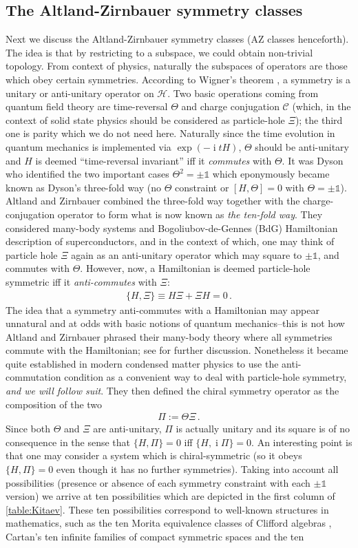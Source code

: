 \documentclass[a4paper,10pt]{article}
\numberwithin{equation}{section}
\theoremstyle{plain}
\theoremstyle{plain}
\theoremstyle{plain}
\theoremstyle{plain}
\theoremstyle{plain}
\theoremstyle{remark}
\theoremstyle{definition}
\theoremstyle{plain}
\newcommand{\ii}{\operatorname{i}}
\newcommand{\calC}{\mathcal{C}}
\newcommand{\calH}{\mathcal{H}}
\newcommand{\Id}{\mathds{1}}
\newcommand{\eq}[1]{\begin{align*}#1\end{align*}}
\newcommand{\eql}[1]{\begin{align}#1\end{align}}
\begin{document}
	\subsection{The Altland-Zirnbauer symmetry classes} 
	Next we discuss the Altland-Zirnbauer symmetry classes \cite{AltlandZirnbauer1997} (AZ classes henceforth). The idea is that by restricting to a subspace, we could obtain non-trivial topology. From context of physics, naturally the subspaces of operators are those which obey certain symmetries. According to Wigner's theorem \cite{Bargmann1964}, a symmetry is a unitary or anti-unitary operator on $\calH$. Two basic operations coming from quantum field theory are time-reversal $\Theta$ and charge conjugation $\calC$ (which, in the context of solid state physics should be considered as particle-hole $\Xi$); the third one is parity which we do not need here. Naturally since the time evolution in quantum mechanics is implemented via $\exp(-\ii t H)$, $\Theta$ should be anti-unitary and $H$ is deemed ``time-reversal invariant'' iff it \emph{commutes} with $\Theta$. It was Dyson \cite{Dyson1962} who identified the two important cases $\Theta^2=\pm\Id$ which eponymously became known as Dyson's three-fold way (no $\Theta$ constraint or $[H,\Theta]=0$ with $\Theta=\pm\Id$). Altland and Zirnbauer \cite{AltlandZirnbauer1997} combined the three-fold way together with the charge-conjugation operator to form what is now known as \emph{the ten-fold way}. They considered many-body systems and Bogoliubov-de-Gennes (BdG) Hamiltonian description of superconductors, and in the context of which, one may think of particle hole $\Xi$ again as an anti-unitary operator which may square to $\pm\Id$, and commutes with $\Theta$. However, now, a Hamiltonian is deemed particle-hole symmetric iff it \emph{anti-commutes} with $\Xi$: \eql{\{H,\Xi\}\equiv H\Xi+\Xi H = 0\,.} The idea that a symmetry anti-commutes with a Hamiltonian may appear unnatural and at odds with basic notions of quantum mechanics--this is not how Altland and Zirnbauer phrased their many-body theory where all symmetries commute with the Hamiltonian; see \cite{Zirnbauer2021} for further discussion. Nonetheless it became quite established in modern condensed matter physics to use the anti-commutation condition as a convenient way to deal with particle-hole symmetry, \emph{and we will follow suit}. They then defined the chiral symmetry operator as the composition of the two \eq{\Pi := \Theta \Xi\,.} Since both $\Theta$ and $\Xi$ are anti-unitary, $\Pi$ is actually unitary and its square is of no consequence in the sense that $\{H,\Pi\}=0$ iff $\{H,\ii \Pi\}=0$. An interesting point is that one may consider a system which is chiral-symmetric (so it obeys $\{H,\Pi\}=0$ even though it has no further symmetries). Taking into account all possibilities (presence or absence of each symmetry constraint with each $\pm\Id$ version) we arrive at ten possibilities which are depicted in the first column of \cref{table:Kitaev}. These ten possibilities correspond to well-known structures in mathematics, such as the ten Morita equivalence classes of Clifford algebras \cite{AtiyahBottShapiro1964}, Cartan's ten infinite families of compact symmetric spaces \cite{Cartan1926,Cartan1927} and the ten 
\end{document}

